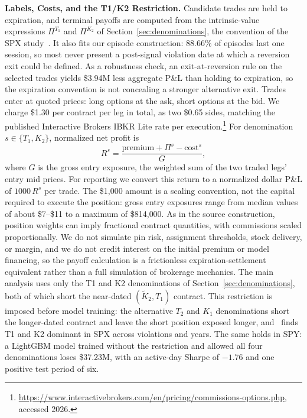 \documentclass[sigconf,review,anonymous]{acmart}
\begin{document}
\smallskip\noindent\textbf{Labels, Costs, and the T1/K2 Restriction.}
\label{sec:labels}
Candidate trades are held to expiration, and terminal payoffs are computed from the intrinsic-value expressions $\Pi^{T_1}$ and $\Pi^{K_2}$ of Section~\ref{sec:denominations}, the convention of the SPX study~\cite{glasserman2025tp2}. It also fits our episode construction: 88.66\% of episodes last one session, so most never present a post-signal violation date at which a reversion exit could be defined. As a robustness check, an exit-at-reversion rule on the selected trades yields \$3.94M less aggregate P\&L than holding to expiration, so the expiration convention is not concealing a stronger alternative exit.
Trades enter at quoted prices: long options at the ask, short options at the bid. We charge \$1.30 per contract per leg in total, as two \$0.65 sides, matching the published Interactive Brokers IBKR Lite rate per execution.\footnote{\url{https://www.interactivebrokers.com/en/pricing/commissions-options.php}, accessed 2026.} For denomination $s\in\{T_1,K_2\}$, normalized net profit is
\[
R^{s}=
\frac{\mathrm{premium}+\Pi^{s}-\mathrm{cost}^{s}}{G},
\]
where $G$ is the gross entry exposure, the weighted sum of the two traded legs' entry mid prices.
For reporting we convert this return to a normalized dollar P\&L of $1000\,R^{s}$ per trade. The \$1{,}000 amount is a scaling convention, not the capital required to execute the position: gross entry exposures range from median values of about \$7--\$11 to a maximum of \$814{,}000. As in the source construction, position weights can imply fractional contract quantities, with commissions scaled proportionally. We do not simulate pin risk, assignment thresholds, stock delivery, or margin, and we do not credit interest on the initial premium or model financing, so the payoff calculation is a frictionless expiration-settlement equivalent rather than a full simulation of brokerage mechanics.
The main analysis uses only the T1 and K2 denominations of Section~\ref{sec:denominations}, both of which short the near-dated $(\tilde K_2,T_1)$ contract. This restriction is imposed before model training: the alternative $T_2$ and $K_1$ denominations short the longer-dated contract and leave the short position exposed longer, and~\cite{glasserman2025tp2} finds T1 and K2 dominant in SPX across violations and years. The same holds in SPY: a LightGBM model trained without the restriction and allowed all four denominations loses \$37.23M, with an active-day Sharpe of $-1.76$ and one positive test period of six.
\end{document}
